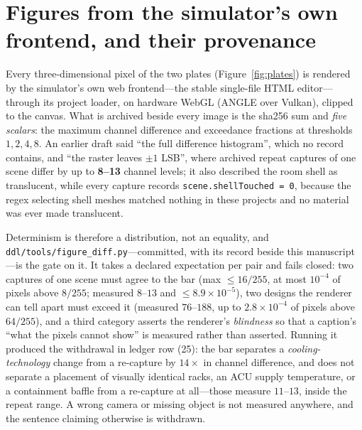 \documentclass{article}
\begin{document}
\section{Figures from the simulator's own frontend, and their provenance}
\label{sec:figures}

Every three-dimensional pixel of the two plates (Figure~\ref{fig:plates}) is rendered
by the simulator's own web frontend---the stable single-file HTML editor---through its
project loader, on hardware WebGL (ANGLE over Vulkan), clipped to the canvas.  What is
archived beside every image is the sha256 sum and \emph{five scalars}: the maximum
channel difference and exceedance fractions at thresholds $1, 2, 4, 8$.  An earlier
draft said ``the full difference histogram'', which no record contains, and ``the raster
leaves $\pm1$ LSB'', where archived repeat captures of one scene differ by up to
\textbf{8--13} channel levels; it also described the room shell as translucent, while
every capture records \texttt{scene.shellTouched = 0}, because the regex selecting shell
meshes matched nothing in these projects and no material was ever made translucent.

Determinism is therefore a distribution, not an equality, and
\texttt{ddl/tools/figure\_diff.py}---committed, with its record beside this
manuscript---is the gate on it.  It takes a declared expectation per pair and fails
closed: two captures of one scene must agree to the bar (max $\le 16/255$, at most
$10^{-4}$ of pixels above $8/255$; measured $8$--$13$ and $\le 8.9\times10^{-5}$), two
designs the renderer can tell apart must exceed it (measured $76$--$188$, up to
$2.8\times10^{-4}$ of pixels above $64/255$), and a third category asserts the
renderer's \emph{blindness} so that a caption's ``what the pixels cannot show'' is
measured rather than asserted.  Running it produced the withdrawal in ledger row (25):
the bar separates a \emph{cooling-technology} change from a re-capture by $14\times$ in
channel difference, and does not separate a placement of visually identical racks, an
ACU supply temperature, or a containment baffle from a re-capture at all---those measure
$11$--$13$, inside the repeat range.  A wrong camera or missing object is not measured
anywhere, and the sentence claiming otherwise is withdrawn.
\end{document}
